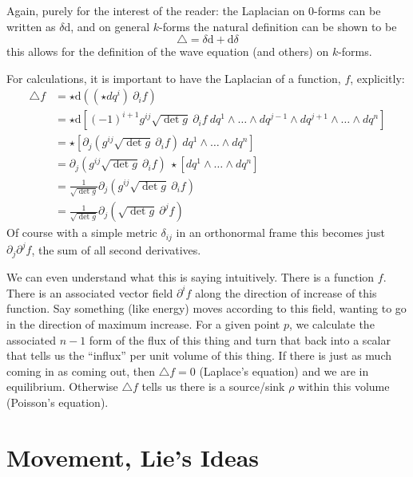 	Again, purely for the interest of the reader: the Laplacian on $0$-forms can be written as $\delta \mathrm d$, and on general $k$-forms the natural definition can be shown to be
		\begin{equation}
			\triangle = \delta \mathrm d + \mathrm d \delta
		\end{equation}
	this allows for the definition of the wave equation (and others) on $k$-forms.
	
	For calculations, it is important to have the Laplacian of a function, $f$, explicitly:
	\begin{align*}
		\triangle f &=   \star \mathrm d ((\star{dq^i}) ~ \partial_i f ) 
				\\&= \star \mathrm d \left[ (-1)^{i+1} g^{ij} \sqrt{\det g} ~ \partial_i f ~ dq^1 \wedge \dots \wedge dq^{j-1} \wedge  dq^{j+1} \wedge \dots \wedge dq^n \right]
				\\&= \star \left[ \partial_j (g^{ij} \sqrt{\det g} ~ \partial_i f ) ~ dq^1 \wedge \dots \wedge dq^n \right]
				\\&= \partial_j (g^{ij} \sqrt{\det g} ~ \partial_i f ) ~ \star\left[ dq^1 \wedge \dots \wedge dq^n\right]
				\\&= \frac{1}{\sqrt{\det g}} \partial_j (g^{ij} \sqrt{\det g} ~ \partial_i f )
				\\&= \frac{1}{\sqrt{\det g}} \partial_j \left(\sqrt{\det g}~ \partial^j f\right)
	\end{align*}
	Of course with a simple metric $\delta_{ij}$ in an orthonormal frame this becomes just $\partial_j \partial^j f$, the sum of all second derivatives.
	
	We can even understand what this is saying intuitively. There is a function $f$. There is an associated vector field $\partial^i f$ along the direction of increase of this function. Say something (like energy) moves according to this field, wanting to go in the direction of maximum increase. For a given point $p$, we calculate the associated $n-1$ form of the flux of this thing and turn that back into a scalar that tells us the ``influx'' per unit volume of this thing. If there is just as much coming in as coming out, then $\triangle f = 0$ (Laplace's equation) and we are in equilibrium. Otherwise $\triangle f$ tells us there is a source/sink $\rho$ within this volume (Poisson's equation). 
	

	\section{Movement, Lie's Ideas}

